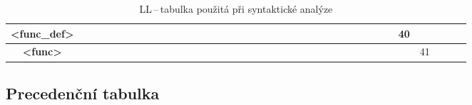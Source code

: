 \documentclass[a4paper,12pt]{article}
\begin{document}
\begin{landscape}
\begin{table}[!ht]
{\begin{tabular}{|c|c|c|c|c|c|c|c|c|c|c|c|c|c|c|c|c|c|c|c|c|c|c|c|c|}
				\textbf{\textless{}func\_def\textgreater{}}   & ~                        & ~              & ~            & ~               & ~          & ~             & ~               & ~             & ~          & ~                                           & ~ & ~  & ~ & ~  & ~ & ~  & ~ & ~  & ~  & ~                                          & 40 & ~  & ~ & ~  \\ \hline
				\textbf{\textless{}func\textgreater{}}        & ~                        & ~              & ~            & ~               & ~          & ~             & ~               & ~             & ~          & ~                                           & ~ & ~  & ~ & ~  & ~ & ~  & ~ & ~  & ~  & ~                                          & ~  & 41 & ~ & ~  \\ \hline
			\end{tabular}
		}
		\vspace{0.75em}
		\caption{LL\,--\,tabulka použitá při syntaktické analýze}
		\label{table:ll_table}
	\end{table}
\end{landscape}

\subsection{Precedenční tabulka}
\end{document}
